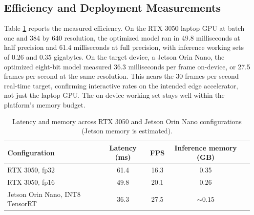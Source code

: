 \subsection{Efficiency and Deployment Measurements}
Table \ref{tab:latency} reports the measured efficiency. On the RTX
3050 laptop GPU at batch one and 384 by 640 resolution, the optimized
model ran in 49.8 milliseconds at half precision and 61.4 milliseconds
at full precision, with inference working sets of 0.26 and 0.35
gigabytes. On the target device, a Jetson Orin Nano, the optimized
eight-bit model measured 36.3 milliseconds per frame on-device, or
27.5 frames per second at the same resolution. This nears the 30
frames per second real-time target, confirming interactive rates on
the intended edge accelerator, not just the laptop GPU. The on-device
working set stays well within the platform's memory budget.

\begin{table}[!htbp]
\centering
\caption{Latency and memory across RTX 3050 and Jetson Orin Nano configurations (Jetson memory is estimated).}
\label{tab:latency}
\small
\begin{tabular}{lcccc}
\toprule
Configuration & Latency (ms) & FPS & Inference memory (GB)\\
\midrule
RTX 3050, fp32 & 61.4 & 16.3 & 0.35\\
RTX 3050, fp16 & 49.8 & 20.1 & 0.26\\
Jetson Orin Nano, INT8 TensorRT & 36.3 & 27.5 & ${\sim}0.15$\\
\bottomrule
\end{tabular}
\end{table}

\FloatBarrier
